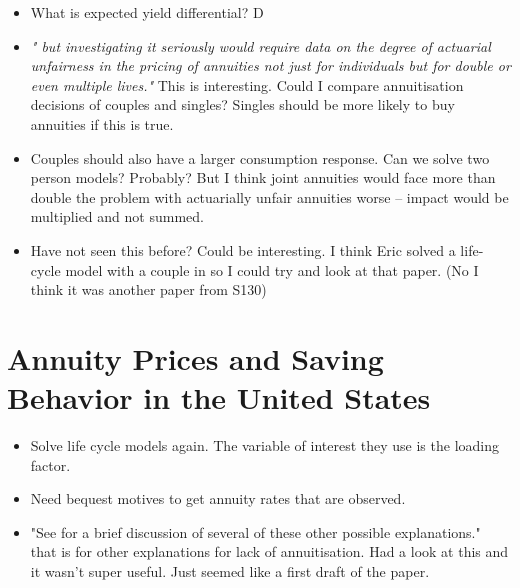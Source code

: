 \documentclass[12pt]{article}
\begin{document}
\begin{itemize}
      \item What is expected yield differential? D
      \item \textit{" but investigating it seriously would require data on the
                  degree of actuarial unfairness in the pricing of annuities not
                  just for individuals but for double or even multiple lives."}
            This is interesting. Could I compare annuitisation decisions
            of couples and singles? Singles should be more likely to buy
            annuities if this is true.

      \item Couples should also have a larger consumption response. Can we solve
            two person models? Probably? But I think joint annuities would face
            more than double the problem with actuarially unfair annuities worse
            -- impact would be multiplied and not summed.

      \item Have not seen this before? Could be interesting. I think Eric solved
            a life-cycle model with a couple in so I could try and look at that
            paper. (No I think it was another paper from S130)

\end{itemize}

\section{Annuity Prices and Saving Behavior in the United States}
\begin{itemize}
      \item Solve life cycle models again. The variable of interest they use is
            the loading factor.

      \item Need bequest motives to get annuity rates that are observed.
      \item "See \cite{friedman_warshawsky_nber_1985} for a brief discussion of
            several of these other possible explanations." that is for other
            explanations for lack of annuitisation. Had a look at this and it
            wasn't super useful. Just seemed like a first draft of the paper.



\end{itemize}
\end{document}
